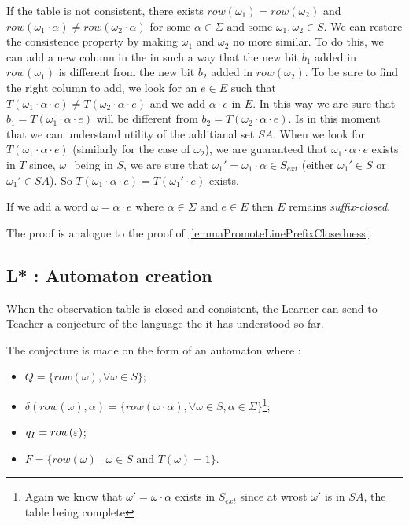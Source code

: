 If the table is not consistent, there exists $row(\omega_1) = row(\omega_2)$ and $row(\omega_1 \cdot \alpha) \neq row(\omega_2 \cdot \alpha)$ for some $\alpha \in \Sigma \text{ and some }\omega_1, \omega_2 \in S$. We can restore the consistence property by making $\omega_1$ and $\omega_2$ no more similar. To do this, we can add a new column in the \OT in such a way that the new bit $b_1$ added in $row(\omega_1)$ is different from the new bit $b_2$ added in $row(\omega_2)$. To be sure to find the right column to add, we look for an $e \in E$ such that $T(\omega_1 \cdot \alpha \cdot e) \neq T(\omega_2 \cdot \alpha \cdot e)$ and we add $\alpha \cdot e$ in $E$. In this way we are sure that $b_1 = T(\omega_1 \cdot \alpha \cdot e)$ will be different from $b_2 = T(\omega_2 \cdot \alpha \cdot e)$. Is in this moment that we can understand utility of the additianal set $SA$. When we look for $T(\omega_1 \cdot \alpha \cdot e)$ (similarly for the case of $\omega_2$), we are guaranteed that $\omega_1 \cdot \alpha \cdot e$ exists in $T$ since, $\omega_1$ being in $S$, we are sure that $\omega_1' = \omega_1 \cdot \alpha \in S_{ext}$ (either $\omega_1' \in S$ or $\omega_1' \in SA$). So $T(\omega_1 \cdot \alpha \cdot e) = T(\omega_1' \cdot e)$ exists.

\begin{lemma}
  If we add a word $\omega = \alpha \cdot e$ where $\alpha \in \Sigma \text{ and } e \in E$ then $E$ remains \textit{suffix-closed}.
\end{lemma}

The proof is analogue to the proof of \cref{lemmaPromoteLinePrefixClosedness}.

\subsection{L* : Automaton creation}

When the observation table is closed and consistent, the Learner can send to Teacher a conjecture of the language the it has understood so far.

The conjecture is made on the form of an automaton where :
\begin{itemize}
  \item $Q = \{row(\omega), \forall \omega \in S\}$;
  \item $\delta(row(\omega), \alpha) = \{row(\omega \cdot \alpha), \forall \omega \in S, \alpha \in \Sigma\}$\footnote{Again we know that $\omega' = \omega\cdot\alpha$ exists in $S_{ext}$ since at wrost $\omega'$ is in $SA$, the table being complete };
  \item $q_I = row(\varepsilon)$;
  \item $F = \{row(\omega) \mid \omega \in S \text{ and } T(\omega) = 1 \}$.
\end{itemize}

